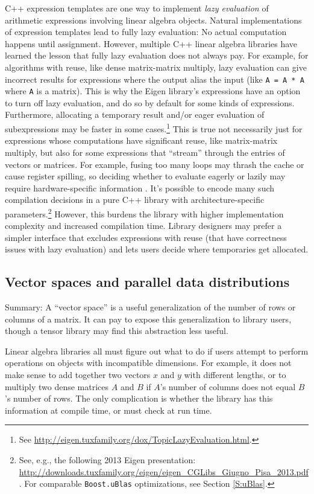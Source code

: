 C++ expression templates are one way to implement \emph{lazy
  evaluation} of arithmetic expressions involving linear algebra
objects.  Natural implementations of expression templates lead to
fully lazy evaluation: No actual computation happens until assignment.
However, multiple C++ linear algebra libraries have learned the lesson
that fully lazy evaluation does not always pay.  For example, for
algorithms with reuse, like dense matrix-matrix multiply, lazy
evaluation can give incorrect results for expressions where the output
alias the input (like \texttt{A = A * A} where \texttt{A} is a
matrix).  This is why the Eigen library's expressions have an option
to turn off lazy evaluation, and do so by default for some kinds of
expressions.  Furthermore, allocating a temporary result and/or eager
evaluation of subexpressions may be faster in some cases.\footnote{See
  \url{http://eigen.tuxfamily.org/dox/TopicLazyEvaluation.html}.}
This is true not necessarily just for expressions whose computations
have significant reuse, like matrix-matrix multiply, but also for some
expressions that ``stream'' through the entries of vectors or
matrices.  For example, fusing too many loops may thrash the cache or
cause register spilling, so deciding whether to evaluate eagerly or
lazily may require hardware-specific information
\cite{siek2008build}. It's possible to encode many such compilation
decisions in a pure C++ library with architecture-specific
parameters.\footnote{See, e.g., the following 2013 Eigen presentation:
  \url{http://downloads.tuxfamily.org/eigen/eigen_CGLibs_Giugno_Pisa_2013.pdf}.
  For comparable \texttt{Boost.uBlas} optimizations, see Section
  \ref{S:uBlas}.}  However, this burdens the library with higher
implementation complexity and increased compilation time.  Library
designers may prefer a simpler interface that excludes expressions
with reuse (that have correctness issues with lazy evaluation) and
lets users decide where temporaries get allocated.

\subsection{Vector spaces and parallel data distributions}
\label{SS:features:spaces}

Summary: A ``vector space'' is a useful generalization of the number
of rows or columns of a matrix.  It can pay to expose this
generalization to library users, though a tensor library may find this
abstraction less useful.

Linear algebra libraries all must figure out what to do if users
attempt to perform operations on objects with incompatible dimensions.
For example, it does not make sense to add together two vectors $x$
and $y$ with different lengths, or to multiply two dense matrices $A$
and $B$ if $A$'s number of columns does not equal $B$'s number of
rows.  The only complication is whether the library has this
information at compile time, or must check at run time.

